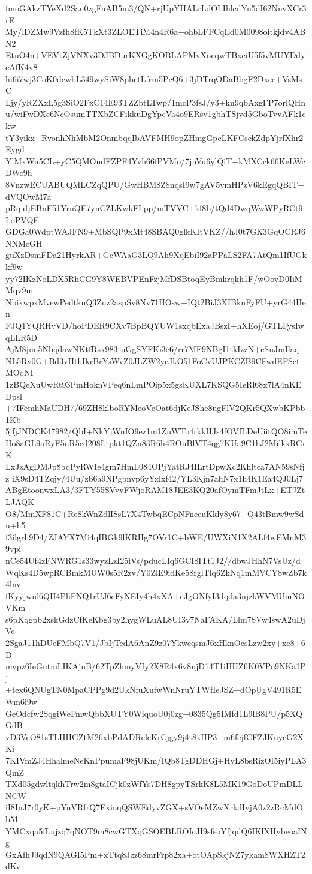 fmoGAkzTYeXd2San0zgFnAB5m3/QN+rjUpYHALrLdOLIhlcdYu5dI62NnvXCr3rE
My/lDZMw9Vzfh8fK5TkXt3ZLOETiM4n4R6a+ohbLFFCqEd0M0098oitkjdv4ABN2
EtuO4n+VEVtZjVNXv3DJBDurKXGgKOBLAPMvXocqwTBxciU5f5vMUYDdycAfK4v8
hi6i7wj3CoK0dcwbL349wySiW8pbetLfrm5PcQ6+3jDTrqODaBbgF2Dxce+VsMsC
Ljy/yRZXxL5g3SiO2FxC14E93TZZbtLTwp/1mcP3fsJ/y3+kn9qbAxgFP7orlQHn
u/wiFwDXc6NcOsumTTXbZCFikkuDgYpcVa4o9ERsv1gbhTSjvd5GboTvvAFk1ckw
tY3yikx+RvonhNhMbM2OnmbqqIbAVFMH9opZHmgGpcLKFCsckZdpYjrfXhr2Eygd
YlMxWn5CL+yC5QMOndFZPF4Yvh66fPVMo/7jnVu6ylQiT+kMXCck66KeLWcDWc9h
8VnzwECUABUQMLCZqQPU/GwHBM8Z8nqsI9w7gAV5vmHPzV6kEgqQBIT+dVQOwM7a
pRqidjEBnE51YrnQE7ynCZLKwkFLpp/mTVVC+kf8b/tQd4DwqWwWPyRCt9LoPVQE
GDGa0WdptWAJFN9+MbSQP9xMt48SBAQ0glkKItVKZ//hJ0t7GK3GqOCRJ6NNMcGH
guXzDsmFDa21HyrkAR+GcWAaG3LQ9Ah9XqEbiI92aPPaLS2FA7AtQm1IfUGkkf9w
yy72IKzNoLDX5RhCG9Y8WEBVPEnFzjMfDSBtoqEyBmkrqkh1F/wOovD0IiMMqv9m
NbixwpxMvewPedtknQ3Zuz2aspSv8Nv71HOsw+IQt2BiJ3XIBknFyFU+yrG44Hen
FJQ1YQRHvVD/hoPDER9CXv7BpBQYUW1sxqbExaJBszI+hXEoj/GTLFysIwqLLR5D
AjM8jun5NbqdawNKtfRsx983tuGgSYFKi3e6/rr7MF9NBgI1tkIzzN+eSuJmIlaq
NL5Rv0G+Bd3vHthIkrBrYsWvZ0JLZW2ycJkO51FoCvUJPKCZB9CFwdEFSctMOqNI
1zBQeXuUwRt93PmHoknVPeq6nLmPOip5x5gsKUXL7KSQG5IeRl68x7lA4nKEDpsl
+7IFemhMaUDH7/69ZH8klboRYMeoVeOat6djKeJShe8ugFlV2QKr5QXwbKPbb1Kb
5jfjJNDCK47982/QbI+NkYjWnIO9ez1m1ZuWTo4rkkHJs4fOVfLDeUiitQO8imTe
Ho8aGL9aRyF5nR5cd208Ltpkt1QZn83R6h4ROuBlVT4qg7KUa9C1hJ2MilkxRGrK
LxJzAgDMJp8bqPyRWIe4gm7HmL084OPjYatRJ4ILrtDpwXc2Khltca7AN59sNfjz
iX9sD4TZqjy/4Uu/zb6a9NPgbnvp6yYxlxf42/YL3Kjn7ahN7x1h4K1Ea4QJ0Lj7
ABgEtoonwxLA3/3FTY55SVvvFWjoRAM18JEE3KQ20afOymTFmJtLx+ETJZtLJAQK
O8/MmXF81C+Re8kWnZdlISsL7X4TwbqECpNFneeuKkly8y67+Q43tBmw9wSdu+h5
f3ilgrh9D4/ZJAYX7Mi4qIBGk9lKRHg7OVr1C+bWE/UWXiN1X2ALf4wEMnM39vpi
nCe54Uf4zFNWRG1s33wyzLzI25iVs/pducLIq6GCI8ITt1J2//dbwJHhN7VsUz/d
WqKs4D5wpRCBmkMUW0s5R2zv/Y0ZlE9idKe58rglTlq6ZkNq1mMVCY8wZb7k4lnv
fKyyjwnl6QH4PhFNQ1rUJ6cFyNEIy4h4xXA+cJgONfyI3dqda3njzkWVMUmNOVKm
s6pKqgpb2xskGdzCfKeKbg3by2hygWLuAL8UI3v7NaFAKA/Llm7SVw4swA2uDjVc
2SgaJ11hDUeFMbQ7V1/JbIjTedA6AnZ9z07YkwcqsmJ6xHknOcsLzw2xy+xe8+6D
mvpz6IeGutmLIKAjnB/62TpZhmyVIy2X8R4x6v8njD14T1iHHZflK0VPo9NKa1Pj
+tex6QNUgTN0MpaCPPg9d2UkNfuXufwWnNruYTWfIeJSZ+dOpUgV491R5EWm6i9w
GeOdcfw2SqgiWeFmwQbbXUTY0WiquoU0j0zg+0835Qg5IMfd1L9lB8PU/p5XQGdB
vD3VcO81sTLHHGZtM26xbPdADRelcKrCjgy9j4t8xHP3+m6fejfCFZJKuycG2XKi
7KIVmZJ4HhalmeNeKnPpumaF98jUKm/IQb8TgDDHGj+HyL8bsRizOI5iyPLA3QmZ
TXd05gdwltqkhTrw2m8gtaICjk0zWfYs7DH8gpyTSrkK8L5MK19GoDoUPmDLLNCW
iI8InJ7r0yK+pYuVRfrQ7ExioqQSWEdyvZGX+sVOeMZwXrkdIyjA0z2zRcMdOb51
YMCxqa5fLujzq7qNOT9m8cwGTXqGSOEBLROIcJI9sfsoYfjqdQ6IKlXHybeoaINg
GxAfhJ9qdN9QAGI5Pm+xTtq8Jzz68mrFrp82xa+otOApSkjNZ7ykam8WXHZT2dKv
